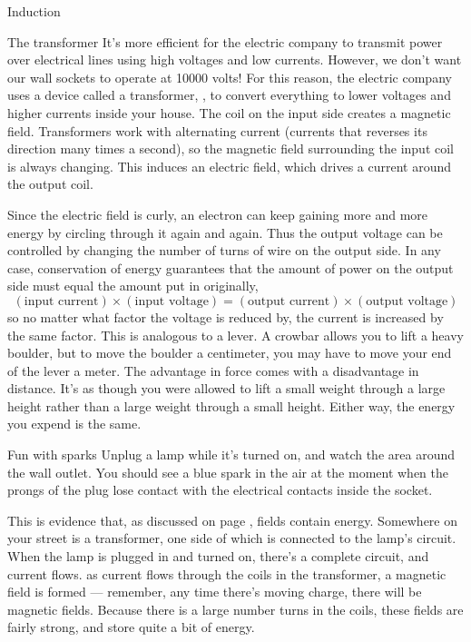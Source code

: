 \begin{envsubsection}{Induction}
\begin{eg}{The transformer}
	It's more efficient for the electric company to transmit
	power over electrical lines using high voltages and low
	currents. However, we don't want our wall sockets to operate
	at 10000 volts! For this reason, the electric company uses a
	device called a transformer, , to
	convert everything to lower voltages and higher currents inside your
	house. The coil on the input side creates a magnetic field.
	Transformers work with alternating current (currents that reverses its
	direction many times a second), so the magnetic
	field surrounding the input coil is always changing. This
	induces an electric field, which drives a current around the output coil.
	
	Since the electric field is curly, an electron can keep gaining more
	and more energy by circling through it again and again. 
	Thus the
	output voltage can be controlled by changing the number of turns
	of wire on the output side. 
	In any case, conservation of energy guarantees
	that the amount of power on the output side must equal the
	amount  put in originally, 
	\begin{equation*}
	  (\text{input current})\times(\text{input voltage}) = 
	  (\text{output current})\times(\text{output voltage}) 
	\end{equation*}
	so no matter what factor the voltage is reduced by, the current is
	increased by the same factor.  This is analogous to a lever. A crowbar allows
	you to lift a heavy boulder, but to move the boulder a centimeter, you may have
	to move your end of the lever a meter. The advantage in force comes with a
	disadvantage in distance. It's as though you were allowed to lift a small weight
	through a large height rather than a large weight through a small height. Either way,
	the energy you expend is the same.
\end{eg}

\begin{eg}{Fun with sparks}
Unplug a lamp while it's turned on, and watch the area around the wall outlet. You should see
a blue spark in the air at the moment when the prongs of the plug lose contact with the electrical
contacts inside the socket.

This is evidence that, as discussed on page \pageref{energy-in-fields}, fields contain energy.
Somewhere on your street is a transformer, one side of which is connected to the lamp's circuit.
When the lamp is plugged in and turned on, there's a complete circuit, and current flows.
as current flows through the coils in the transformer, a magnetic field is formed --- remember,
any time there's moving charge, there will be magnetic fields. Because there is a large number turns
in the coils, these fields are fairly strong, and store quite a bit of energy.


\end{eg}
\end{envsubsection}
